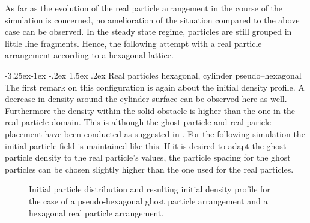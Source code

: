 \documentclass[11pt,a4paper,twoside]{report}
\makeatletter
\renewcommand\paragraph{\@startsection{paragraph}{4}{\z@}%
  {-3.25ex\@plus -1ex \@minus -.2ex}%
  {1.5ex \@plus .2ex}%
  {\normalfont\normalsize\bfseries}}
\makeatother
\begin{document}
As far as the evolution of the real particle arrangement in the course of the simulation is concerned, no amelioration of the situation compared to the above case can be observed. In the steady state regime, particles are still grouped in little line fragments. Hence, the following attempt with a real particle arrangement according to a hexagonal lattice.


\paragraph{Real particles hexagonal, cylinder pseudo--hexagonal}
The first remark on this configuration is again about the initial density profile. A decrease in density around the cylinder surface can be observed here as well. Furthermore the density within the solid obstacle is higher than the one in the real particle domain. This is although the ghost particle and real paricle  placement have been conducted as suggested in \cite{Zhu1999}. %
For the following simulation the initial particle field is maintained like this. If it is desired to adapt the ghost particle density to the real particle's values, the particle spacing for the ghost particles can be chosen slightly higher than the one used for the real particles.

\begin{figure}[h]
\centering
\label{fig:PorosResultsCylinder_prtlDiscontinuity_Hex_pseudoHex}

\caption[Initial situation for cylinder porosities]{Initial particle distribution   and resulting initial density profile  for the case of a pseudo-hexagonal ghost particle arrangement and a hexagonal real particle arrangement.}	
\end{figure}
\end{document}
